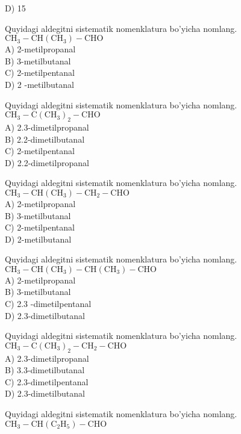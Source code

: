 D) 15
  \item Quyidagi aldegitni sistematik nomenklatura bo'yicha nomlang.\\
$\mathrm{CH}_{3}-\mathrm{CH}\left(\mathrm{CH}_{3}\right)-\mathrm{CHO}$\\
A) 2-metilpropanal\\
B) 3-metilbutanal\\
C) 2-metilpentanal\\
D) 2 -metilbutanal\\
  \item Quyidagi aldegitni sistematik nomenklatura bo'yicha nomlang.\\
$\mathrm{CH}_{3}-\mathrm{C}\left(\mathrm{CH}_{3}\right)_{2}-\mathrm{CHO}$\\
A) 2.3-dimetilpropanal\\
B) 2.2-dimetilbutanal\\
C) 2-metilpentanal\\
D) 2.2-dimetilpropanal
  \item Quyidagi aldegitni sistematik nomenklatura bo'yicha nomlang.\\
$\mathrm{CH}_{3}-\mathrm{CH}\left(\mathrm{CH}_{3}\right)-\mathrm{CH}_{2}-\mathrm{CHO}$\\
A) 2-metilpropanal\\
B) 3-metilbutanal\\
C) 2-metilpentanal\\
D) 2-metilbutanal
  \item Quyidagi aldegitni sistematik nomenklatura bo'yicha nomlang. $\mathrm{CH}_{3}-\mathrm{CH}\left(\mathrm{CH}_{3}\right)-\mathrm{CH}\left(\mathrm{CH}_{3}\right)-\mathrm{CHO}$\\
A) 2-metilpropanal\\
B) 3-metilbutanal\\
C) 2.3 -dimetilpentanal\\
D) 2.3-dimetilbutanal
  \item Quyidagi aldegitni sistematik nomenklatura bo'yicha nomlang.\\
$\mathrm{CH}_{3}-\mathrm{C}\left(\mathrm{CH}_{3}\right)_{2}-\mathrm{CH}_{2}-\mathrm{CHO}$\\
A) 2.3-dimetilpropanal\\
B) 3.3-dimetilbutanal\\
C) 2.3-dimetilpentanal\\
D) 2.3-dimetilbutanal
  \item Quyidagi aldegitni sistematik nomenklatura bo'yicha nomlang.\\
$\mathrm{CH}_{3}-\mathrm{CH}\left(\mathrm{C}_{2} \mathrm{H}_{5}\right)-\mathrm{CHO}$\\
